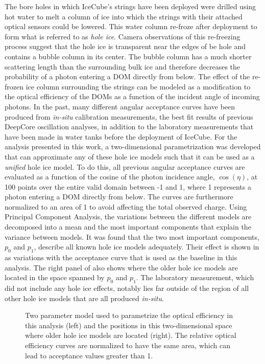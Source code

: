 The bore holes in which IceCube's strings have been deployed were drilled using hot water to melt a column of ice into which the strings with their attached optical sensors could be lowered.
This water column re-froze after deployment to form what is referred to as \emph{hole ice}.
Camera observations of this re-freezing process suggest that the hole ice is transparent near the edges of be hole and contains a bubble column in its center.
The bubble column has a much shorter scattering length than the surrounding bulk ice and therefore decreases the probability of a photon entering a DOM directly from below.
The effect of the re-frozen ice column surrounding the strings can be modeled as a modification to the optical efficiency of the DOMs as a function of the incident angle of incoming photons.
In the past, many different angular acceptance curves have been produced from \emph{in-situ} calibration measurements\cite{flasher_calibration}, the best fit results of previous DeepCore oscillation analyses, in addition to the laboratory measurements that have been made in water tanks before the deployment of IceCube.
For the analysis presented in this work, a two-dimensional parametrization was developed that can approximate any of these hole ice models such that it can be used as a \emph{unified} hole ice model.
To do this, all previous angular acceptance curves are evaluated as a function of the cosine of the photon incidence angle, $\cos(\eta)$, at 100 points over the entire valid domain between -1 and 1, where 1 represents a photon entering a DOM directly from below.
The curves are furthermore normalized to an area of 1 to avoid affecting the total observed charge.
Using Principal Component Analysis, the variations between the different models are decomposed into a mean and the most important components that explain the variance between models.
It was found that the two most important components, $p_0$ and $p_1$, describe all known hole ice models adequately.
Their effect is shown in  as variations with the acceptance curve that is used as the baseline in this analysis.
The right panel of  also shows where the older hole ice models are located in the space spanned by $p_0$ and $p_1$.
The laboratory measurement, which did not include any hole ice effects, notably lies far outside of the region of all other hole ice models that are all produced \emph{in-situ}.

\begin{figure}
    \centering
    
    
    \caption{Two parameter model used to parametrize the optical efficiency in this analysis (left) and the positions in this two-dimensional space where older hole ice models are located (right). The relative optical efficiency curves are normalized to have the same area, which can lead to acceptance values greater than 1.}
    \label{fig:hole-ice-parametrization}
\end{figure}

